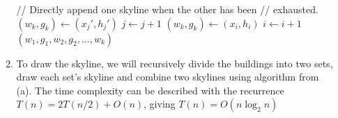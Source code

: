 \documentclass{article}
\begin{document}
\begin{enumerate}
\begin{enumerate}
\begin{algorithmic}[1]
                \State // Directly append one skyline when the other has been
                \State // exhausted.
                        \State $(w_k, g_k) \gets (x_j', h_j')$
                        \State $j \gets j + 1$
                    \EndWhile
                        \State $(w_k, g_k) \gets (x_i, h_i)$
                        \State $i \gets i + 1$
                    \EndWhile
                \EndIf
            \State \Return $(w_1, g_1, w_2, g_2, \dots, w_k)$
        \end{algorithmic}

        \item To draw the skyline, we will recursively divide the buildings into two sets, draw each set's skyline and combine two skylines using algorithm from (a). The time complexity can be described with the recurrence $T(n) = 2T(n/2) + O(n)$, giving $T(n) = O(n\log_2 n)$
    \end{enumerate}
\end{enumerate}
\end{document}
